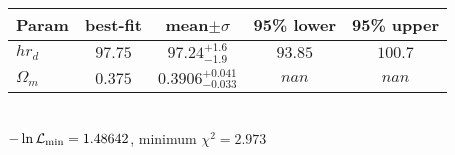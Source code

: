 \begin{tabular}{|l|c|c|c|c|} 
 \hline 
Param & best-fit & mean$\pm\sigma$ & 95\% lower & 95\% upper \\ \hline 
$h r_{{d} }$ &$97.75$ & $97.24_{-1.9}^{+1.6}$ & $93.85$ & $100.7$ \\ 
$\Omega_{m }$ &$0.375$ & $0.3906_{-0.033}^{+0.041}$ & $nan$ & $nan$ \\ 
\hline 
 \end{tabular} \\ 
$-\ln{\cal L}_\mathrm{min} =1.48642$, minimum $\chi^2=2.973$ \\ 
